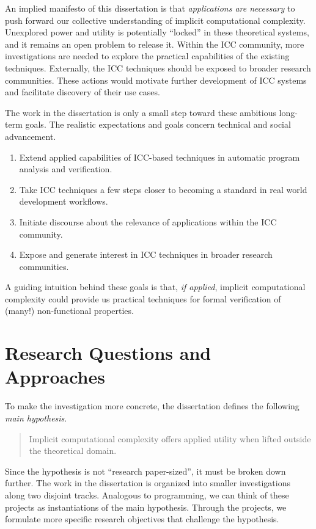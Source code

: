 An implied manifesto of this dissertation is that \emph{applications are necessary} to push forward our collective understanding of implicit computational complexity.
Unexplored power and utility is potentially \enquote{locked} in these theoretical systems, and it remains an open problem to release it.
Within the ICC community, more investigations are needed to explore the practical capabilities of the existing techniques.
Externally, the ICC techniques should be exposed to broader research communities.
These actions would motivate further development of ICC systems and facilitate discovery of their use cases.

The work in the dissertation is only a small step toward these ambitious long-term goals.
The realistic expectations and goals concern technical and social advancement.
\begin{enumerate}
\item Extend {applied} capabilities of ICC-based techniques in automatic program analysis and verification.
\item Take ICC techniques a few steps closer to becoming a standard in real world development workflows.
\item Initiate discourse about the relevance of applications within the ICC community.
\item Expose and generate interest in ICC techniques in broader research communities.
\end{enumerate}
A guiding intuition behind these goals is that, \emph{if applied}, implicit computational complexity could provide us practical techniques for formal verification of (many!) non-functional properties.

\section{Research Questions and Approaches}

To make the investigation more concrete, the dissertation defines the following \emph{main hypothesis}.
\begin{quote}
\noindent Implicit computational complexity offers applied utility when lifted outside the theoretical domain.
\end{quote}
Since the hypothesis is not \enquote{research paper-sized}, it must be broken  down further.
The work in the dissertation is organized into smaller investigations along two disjoint {tracks}.
Analogous to programming, we can think of these projects as instantiations of the main hypothesis.
Through the projects, we formulate more specific research objectives that challenge the hypothesis.

